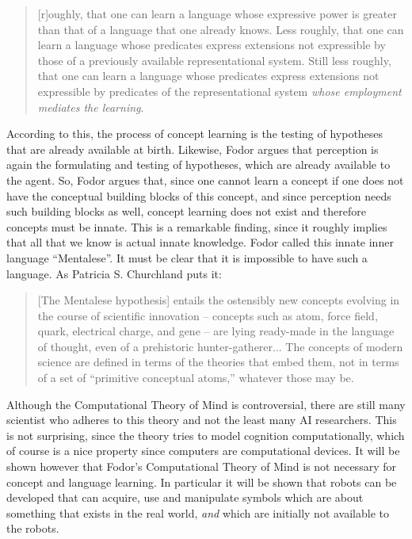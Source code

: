 
\begin{quote}
[r]oughly, that one can learn a language whose expressive power is greater than that of a language that one already knows. Less roughly, that one can learn a language whose predicates express extensions not expressible by those of a previously available representational system. Still less roughly, that one can learn a language whose predicates express extensions not expressible by predicates of the representational system {\em whose employment mediates the learning}. \citep[86, Fodor's italics]{fodor:1975}
\end{quote}


According to this, the process of concept learning is the testing of hypotheses that are already available at birth. Likewise, Fodor argues that perception is again the formulating and testing of hypotheses, which are already available to the agent. So, Fodor argues that, since one cannot learn a concept if one does not have the conceptual building blocks of this concept, and since perception needs such building blocks as well, concept learning does not exist and therefore concepts must be innate. This is a remarkable finding, since it roughly implies that all that we know is actual innate knowledge. Fodor called this innate inner language ``Mentalese''. It must be clear that it is impossible to have such a language. As Patricia S. Churchland puts it:

\begin{quote}
[The Mentalese hypothesis] entails the ostensibly new concepts evolving in the course of scientific innovation -- concepts such as atom, force field, quark, electrical charge, and gene -- are lying ready-made in the language of thought, even of a prehistoric hunter-gatherer... The concepts of modern science are defined in terms of the theories that embed them, not in terms of a set of ``primitive conceptual atoms,'' whatever those may be. \citep[389]{p.s.churchland:1986}
\end{quote}


Although the Computational Theory of Mind is controversial, there are still many scientist who adheres to this theory and not the least many AI researchers. This is not surprising, since the theory tries to model cognition computationally, which of course is a nice property since computers are computational devices. It will be shown however that Fodor's Computational Theory of Mind is not necessary for concept and language learning. In particular it will be shown that robots can be developed that can acquire, use and manipulate symbols which are about something that exists in the real world, {\em and} which are initially not available to the robots.
	
